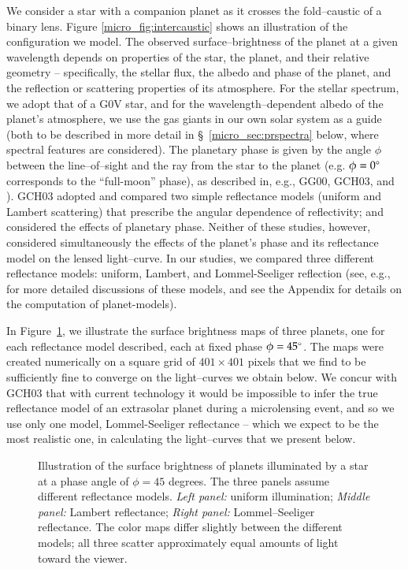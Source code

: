 We consider a star with a companion planet as it crosses the
fold--caustic of a binary lens.  Figure \ref{micro_fig:intercaustic} shows
an illustration of the configuration we model.  The observed
surface--brightness of the planet at a given wavelength depends on
properties of the star, the planet, and their relative geometry --
specifically, the stellar flux, the albedo and phase of the planet,
and the reflection or scattering properties of its atmosphere.  For
the stellar spectrum, we adopt that of a G0V star, and for the
wavelength--dependent albedo of the planet's atmosphere, we use the
gas giants in our own solar system as a guide (both to be described in
more detail in \S~\ref{micro_sec:prspectra} below, where spectral features
are considered).  The planetary phase is given by the angle $\phi$
between the line--of--sight and the ray from the star to the planet
(e.g. $\phi=0\mbox{$^\circ$}$ corresponds to the ``full-moon'' phase), as
described in, e.g., GG00, GCH03, and \citet{ashton+lewis2001}).  GCH03
adopted and compared two simple reflectance models (uniform and
Lambert scattering) that prescribe the angular dependence of
reflectivity; and \citet{ashton+lewis2001} considered the effects of
planetary phase.  Neither of these studies, however, considered
simultaneously the effects of the planet's phase and its reflectance
model on the lensed light--curve.  In our studies, we compared three
different reflectance models: uniform, Lambert, and Lommel-Seeliger
reflection (see, e.g., \citet{efford1991} for more detailed
discussions of these models, and see the Appendix for details on the
computation of planet-models).

In Figure~\ref{micro_fig:planets}, we illustrate the surface brightness maps
of three planets, one for each reflectance model described, each at
fixed phase $\phi=45\mbox{$^\circ$}$.  The maps were created numerically on a
square grid of $401\times401$ pixels that we find to be sufficiently
fine to converge on the light--curves we obtain below.  We concur with
GCH03 that with current technology it would be impossible to infer the
true reflectance model of an extrasolar planet during a microlensing
event, and so we use only one model, Lommel-Seeliger reflectance -- 
which we expect to be the most realistic one, in calculating the
light--curves that we present below.

\begin{figure}[p]
\caption[Illustration of the surface brightness of 3 model
planets.]{Illustration of the surface brightness of planets
illuminated by a star at a phase angle of $\phi=45$ degrees.  The
three panels assume different reflectance models. {\em Left panel:}
uniform illumination; {\em Middle panel:} Lambert reflectance; {\em
Right panel:} Lommel--Seeliger reflectance.  The color maps differ
slightly between the different models; all three scatter approximately
equal amounts of light toward the viewer.}
\label{micro_fig:planets} 
\end{figure}
\afterpage{\clearpage}


